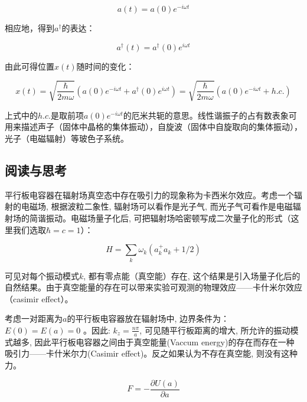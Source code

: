 \begin{equation}
a(t) = a(0) e^{- i \omega t} 
\end{equation}

相应地，得到$a^\dagger$的表达：

\begin{equation}
a^\dagger(t) = a^\dagger(0) e^{i \omega t} 
\end{equation}

由此可得位置$x(t)$随时间的变化：

\begin{equation}
x(t) = \sqrt{\frac{\hbar}{ 2 m \omega}}  \left( a(0) e^{-i \omega t} + a^\dagger(0) e^{i \omega t}  \right) = \sqrt{\frac{\hbar}{ 2 m \omega}}  \left( a(0) e^{-i \omega t} + h.c.  \right) 
\end{equation}

上式中的$h.c.$是取前项$a(0) e^{-i \omega t}$的厄米共轭的意思。线性谐振子的占有数表象可用来描述声子（固体中晶格的集体振动），自旋波（固体中自旋取向的集体振动），光子（电磁辐射）等玻色子系统。

\subsection*{阅读与思考}


平行板电容器在辐射场真空态中存在吸引力的现象称为卡西米尔效应。考虑一个辐射的电磁场,
根据波粒二象性, 辐射场可以看作是光子气,
而光子气可看作是电磁辐射场的简谐振动。电磁场量子化后,
可把辐射场哈密顿写成二次量子化的形式（这里我们选取$\hbar=c=1$）：


\begin{equation*}
    H=\sum\limits_k \omega_k (a_k^{+}a_k + 1/2)
\end{equation*}


可见对每个振动模式$k$, 都有零点能（真空能）存在,
这个结果是引入场量子化后的自然结果。由于真空能量的存在可以带来实验可观测的物理效应——卡什米尔效应（casimir
effect）。


考虑一对距离为$a$的平行板电容器放在辐射场中, 边界条件为：
$E(0)=E(a)=0$ 。因此: $k_z = \frac{n \pi}{a}$,
可见随平行板距离的增大, 所允许的振动模式越多,
因此平行板电容器之间由于真空能量(Vaccum
energy)的存在而存在一种吸引力——卡什米尔力(Casimir
effect)。反之如果认为不存在真空能, 则没有这种力。



\begin{equation*}
 F=-\frac{\partial U(a)}{\partial a}
\end{equation*}


